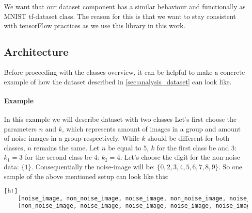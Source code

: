 We want that our dataset component has a similar behaviour and functionally
as MNIST tf-dataset class. The reason for this is that we want to stay
consistent with tensorFlow practices as we use this library in this work.





\subsection{Architecture}

Before proceeding with the classes overview, it can be helpful
to make a concrete example of how the dataset described in
\autoref{sec:analysis_dataset} can look like.

\paragraph{Example} In this example we will describe dataset with two classes
Let's first choose the parameters $n$ and $k$,
which represents amount of images in a group and amount of noise images
in a group respectively. While $k$
should be different for both classes, $n$ remains the same.
Let $n$ be equal to $5$, $k$ for the first class be and $3$: $k_1 = 3$
for the second class be $4$: $k_2 = 4$. Let's choose the digit for the non-noise
data: $\{1\}$. Consequentially the noise-image will
be: $\{0, 2, 3, 4, 5, 6, 7, 8, 9\}$.
So one sample of the above mentioned setup can look like this:

\begin{lstlisting}[language=Python][h!]
	[noise_image, non_noise_image, noise_image, non_noise_image, noise_image ] # class 1
	[non_noise_image, noise_image, noise_image, noise_image, noise_image ] # class 2
\end{lstlisting}


